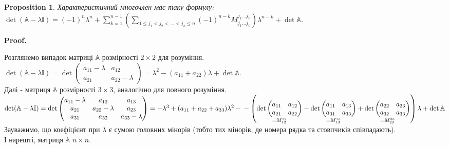 \documentclass[a4paper, 10pt]{article}
\makeatletter
\theoremstyle{theoremdd}
\newtheorem{proposition}[theorem]{Proposition}
\renewenvironment{proof}[1][Proof.\\]{\par
\pushQED{\hfill \qed}%
\normalfont \topsep6\p@\@plus6\p@\relax
\trivlist
\item\relax
{\bfseries
#1\@addpunct{.}}\hspace\labelsep\ignorespaces
}{%
\popQED\endtrivlist\@endpefalse
}
\makeatother
\begin{document}
\begin{proposition}
Характеристичний многочлен має таку формулу: \\ $\det(\mathbb{A} - \lambda \mathbb{I}) = \displaystyle (-1)^n \lambda^n + \sum_{k=1}^{n-1} \left( \sum_{1 \leq j_1 < j_2 < \dots < j_k \leq n} (-1)^{n-k} M_{j_1 \dots j_n}^{j_1 \dots j_n} \right) \lambda^{n-k} + \det \mathbb{A}$.
\end{proposition}

\begin{proof}
Розглянемо випадок матриці $\mathbb{A}$ розмірності $2 \times 2$ для розуміння.\\
$\det (\mathbb{A} - \lambda \mathbb{I}) = \det \begin{pmatrix}
a_{11}-\lambda & a_{12} \\
a_{21} & a_{22} - \lambda
\end{pmatrix} = \lambda^2 - (a_{11}+a_{22})\lambda + \det \mathbb{A}$.
\bigskip \\
Далі - матриця $\mathbb{A}$ розмірності $3 \times 3$, аналогічно для повного розуміння.\\
$\det (\mathbb{A} - \lambda \mathbb{I}) = \det \begin{pmatrix}
a_{11}-\lambda & a_{12} & a_{13} \\
a_{21} & a_{22}-\lambda & a_{23} \\
a_{31} & a_{32} & a_{33}-\lambda \\
\end{pmatrix} = -\lambda^3 + (a_{11}+a_{22}+a_{33})\lambda^2 - \\ - \left(\underset{=M_{12}^{12}}{\det \begin{pmatrix}
a_{11} & a_{12} \\
a_{21} & a_{22}
\end{pmatrix}} - \underset{=M_{13}^{13}}{\det \begin{pmatrix}
a_{11} & a_{13} \\
a_{31} & a_{33}
\end{pmatrix}} + \underset{=M_{23}^{23}}{\det \begin{pmatrix}
a_{22} & a_{23} \\
a_{32} & a_{33}
\end{pmatrix}} \right)\lambda + \det \mathbb{A}$\\
Зауважимо, що коефіцієнт при $\lambda$ є сумою головних мінорів (тобто тих мінорів, де номера рядка та стовпчиків співпадають).
\bigskip \\
І нарешті, матриця $\mathbb{A}$ $n \times n$.\\

\end{proof}
\end{document}
